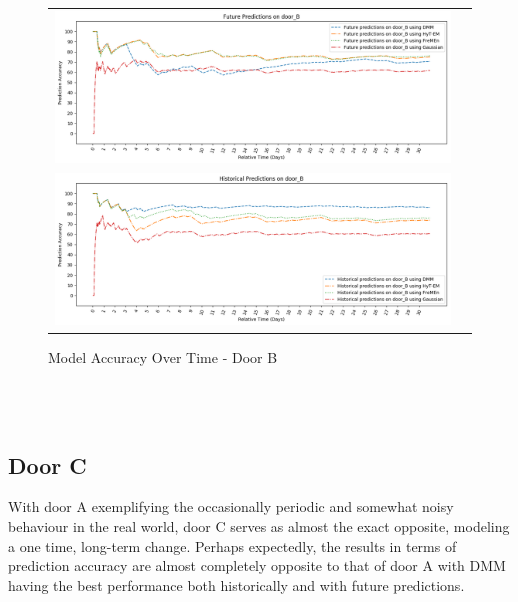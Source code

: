 \begin{center}
\begin{figure}[!Hp]
  \begin{tabular}{cc}
    {\includegraphics[width = 6in]{images/results/Future_Predictions_on_door_B.png}} \\
    {\includegraphics[width = 6in]{images/results/Historical_Predictions_on_door_B.png}} \\
  \end{tabular}
  \caption{Model Accuracy Over Time - Door B}
\end{figure}\\ \\
\end{center}


\subsection { Door C }

With door A exemplifying the occasionally periodic and somewhat noisy
behaviour in the real world, door C serves as almost the exact opposite,
modeling a one time, long-term change.
Perhaps expectedly, the results in terms of prediction accuracy are
almost completely opposite to that of door A with DMM having the best
performance both historically and with future predictions. \\

